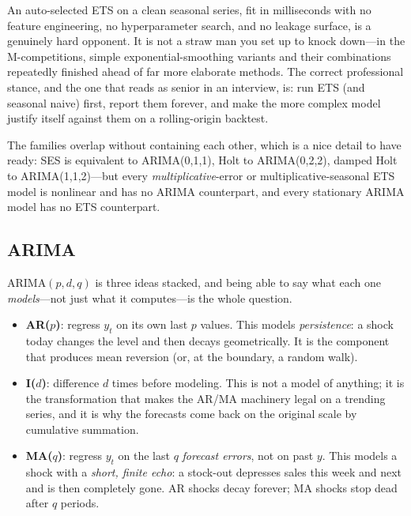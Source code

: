 \begin{keyinsight}
An auto-selected ETS on a clean seasonal series, fit in milliseconds with no feature engineering, no hyperparameter search, and no leakage surface, is a genuinely hard opponent. It is not a straw man you set up to knock down---in the M-competitions, simple exponential-smoothing variants and their combinations repeatedly finished ahead of far more elaborate methods. The correct professional stance, and the one that reads as senior in an interview, is: run ETS (and seasonal naive) first, report them forever, and make the more complex model justify itself against them on a rolling-origin backtest.
\end{keyinsight}

The families overlap without containing each other, which is a nice detail to have ready: SES is equivalent to ARIMA(0,1,1), Holt to ARIMA(0,2,2), damped Holt to ARIMA(1,1,2)---but every \emph{multiplicative}-error or multiplicative-seasonal ETS model is nonlinear and has no ARIMA counterpart, and every stationary ARIMA model has no ETS counterpart.

\subsection{ARIMA}

ARIMA$(p,d,q)$ is three ideas stacked, and being able to say what each one \emph{models}---not just what it computes---is the whole question.

\begin{itemize}
    \item \textbf{AR($p$)}: regress $y_t$ on its own last $p$ values. This models \emph{persistence}: a shock today changes the level and then decays geometrically. It is the component that produces mean reversion (or, at the boundary, a random walk).
    \item \textbf{I($d$)}: difference $d$ times before modeling. This is not a model of anything; it is the transformation that makes the AR/MA machinery legal on a trending series, and it is why the forecasts come back on the original scale by cumulative summation.
    \item \textbf{MA($q$)}: regress $y_t$ on the last $q$ \emph{forecast errors}, not on past $y$. This models a shock with a \emph{short, finite echo}: a stock-out depresses sales this week and next and is then completely gone. AR shocks decay forever; MA shocks stop dead after $q$ periods.
\end{itemize}

